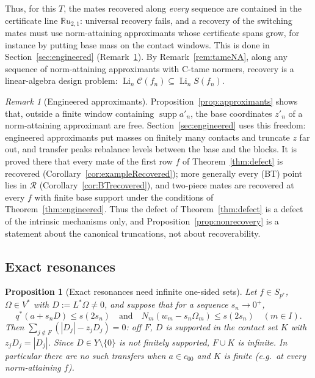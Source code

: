 \documentclass[10pt]{amsart}
\newtheorem{proposition}[theorem]{Proposition}
\theoremstyle{definition}
\theoremstyle{remark}
\newtheorem{remark}[theorem]{Remark}
\newcommand{\supp}{\operatorname{supp}}
\newcommand{\R}{\mathbb R}
\newcommand{\Cset}{\mathcal C}
\newcommand{\Li}{\operatorname*{Li}}
\newcommand{\Rec}{\mathcal R}
\begin{document}
Thus, for this $T$, the mates recovered along \emph{every} sequence are
contained in the certificate line $\R u_{2,1}$: universal recovery fails, and
a recovery of the switching mates must use norm-attaining approximants whose
certificate spans grow, for instance by putting base mass on the contact
windows.  This is done in Section~\ref{sec:engineered}
(Remark~\ref{rem:engineered}).  By Remark~\ref{rem:tameNA}, along
any sequence of norm-attaining approximants with C-tame normers, recovery is
a linear-algebra design problem: $\Li_n\Cset(f_n)\subseteq\Li_nS(f_n)$.

\begin{remark}[Engineered approximants]\label{rem:engineered}
Proposition~\ref{prop:approximants} shows that, outside a finite window
containing $\supp a'_n$, the base coordinates $z'_n$ of a norm-attaining
approximant are free.  Section~\ref{sec:engineered} uses this freedom:
engineered approximants put masses on finitely many contacts and truncate
$z$ far out, and transfer peaks rebalance levels between the base and the
blocks.  It is proved there that every mate of the first row $f$ of
Theorem~\ref{thm:defect} is recovered (Corollary~\ref{cor:exampleRecovered});
more generally every \textup{(BT)} point lies in $\Rec$
(Corollary~\ref{cor:BTrecovered}), and two-piece mates are recovered at
every $f$ with finite base support under the conditions of
Theorem~\ref{thm:engineered}.  Thus the defect of Theorem~\ref{thm:defect}
is a defect of the intrinsic mechanisms only, and
Proposition~\ref{prop:nonrecovery} is a statement about the canonical
truncations, not about recoverability.
\end{remark}

\subsection{Exact resonances}

\begin{proposition}[Exact resonances need infinite one-sided sets]\label{prop:exact}
Let $f\in S_{p^*}$, $\Omega\in V^*$ with $D:=L^*\Omega\ne0$, and suppose that
for a sequence $s_n\to0^+$,
\[
 q^*(a+s_nD)\le s(2s_n)\quad\text{and}\quad N_m(w_m-s_n\Omega_m)\le s(2s_n)
 \quad(m\in I).
\]
Then $\sum_{j\notin F}(|D_j|-z_jD_j)=0$: off $F$, $D$ is supported in the
contact set $K$ with $z_jD_j=|D_j|$.  Since $D\in Y\setminus\{0\}$ is not
finitely supported, $F\cup K$ is infinite.  In particular there are no such
transfers when $a\in c_{00}$ and $K$ is finite \textup{(}e.g.\ at every
norm-attaining $f$\textup{)}.
\end{proposition}
\end{document}
